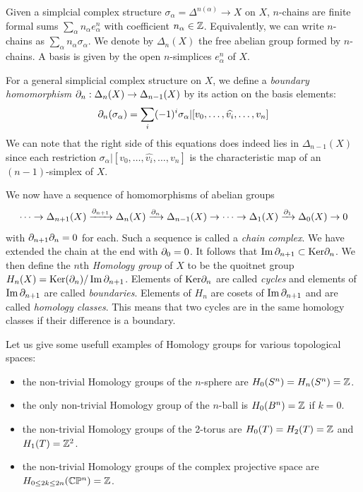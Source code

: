         Given a simplcial complex structure $\sigma_\alpha=\Delta^{n(\alpha)}\to X$ on $X$, $n$-chains are finite formal sums $\sum_\alpha n_\alpha e^n_\alpha$ with coefficient $n_\alpha\in\mathbb{Z}$. Equivalently, we can write $n$-chains as $\sum_\alpha n_\alpha \sigma_\alpha$. We denote by $\Delta_n(X)$ the free abelian group formed by $n$-chains. A basis is given by the open $n$-simplices $e^n_\alpha$ of $X$.

        For a general simplicial complex structure on $X$, we define a \emph{boundary homomorphism} $\partial_n:\Delta_n(X)\to\Delta_{n-1}(X)$ by its action on the basis elements:
        \begin{equation}
            \partial_n(\sigma_\alpha)=\sum_i(-1)^i\sigma_\alpha|[v_0,\dots,\widehat{v_i},\dots,v_n]
        \end{equation}
        We can note that the right side of this equations does indeed lies in $\Delta_{n-1}(X)$ since each restriction $\sigma_\alpha|[v_0,\dots,\hat{v_i},\dots,v_n]$ is the characteristic map of an $(n-1)$-simplex of $X$.

        We now have a sequence of homomorphisms of abelian groups
        \begin{equation}
            \dots\to \Delta_{n+1}(X)\xrightarrow[]{\partial_{n+1}}\Delta_n(X)\xrightarrow[]{\partial_{n}}\Delta_{n-1}(X)\to\dots\to\Delta_1(X)\xrightarrow[]{\partial_{1}}\Delta_0(X)\to 0
        \end{equation}
        with $\partial_{n+1}\partial_n=0$ for each. Such a sequence is called a \emph{chain complex}. We have extended the chain at the end with $\partial_0=0$. It follows that $\Im\partial_{n+1}\subset\text{Ker}\partial_n$. We then define the $n$th \emph{Homology group} of $X$ to be the quoitnet group $H_n(X)=\text{Ker}(\partial_n)/\Im\partial_{n+1}$. Elements of $\text{Ker}\partial_n$ are called \emph{cycles} and elements of $\Im\partial_{n+1}$ are called \emph{boundaries}. Elements of $H_n$ are cosets of $\Im\partial_{n+1}$ and are called \emph{homology classes}. This means that two cycles are in the same homology classes if their difference is a boundary.

        \begin{examp*}
            Let us give some usefull examples of Homology groups for various topological spaces:
            \begin{itemize}
                \item the non-trivial Homology groups of the $n$-sphere are $H_0(S^n)=H_n(S^n)=\mathbb{Z}$.
                \item the only non-trivial Homology group of the $n$-ball is $H_0(B^n)=\mathbb{Z}$ if $k=0$.
                \item the non-trivial Homology groups of the 2-torus are $H_0(T)=H_2(T)=\mathbb{Z}$ and $H_1(T)=\mathbb{Z}^2$.
                \item the non-trivial Homology groups of the complex projective space are $H_{0\leq 2k\leq 2n}(\mathbb{C}\mathbb{P}^n)=\mathbb{Z}$.
            \end{itemize}
        \end{examp*}

